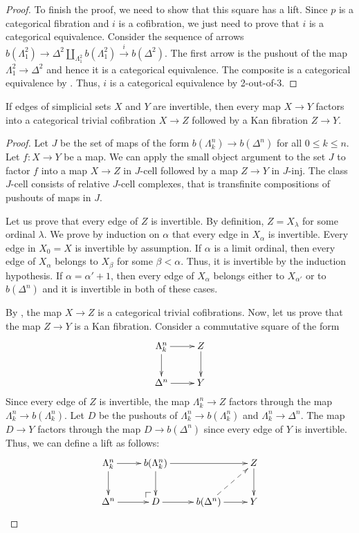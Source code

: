\documentclass[reqno]{amsart}
\makeatletter
\theoremstyle{definition}
\theoremstyle{remark}
\newcommand{\class}[2]{#1\text{-}\mathrm{#2}}
\newcommand{\I}{\mathrm{I}}
\newcommand{\Icell}[1][\I]{\class{#1}{cell}}
\newcommand{\Iinj}[1][\I]{\class{#1}{inj}}
\numberwithin{figure}{section}
\newcommand{\po}[1][dr]{\save*!/#1+1.2pc/#1:(1,-1)@^{|-}\restore}
\makeatother
\begin{document}
\begin{proof}
To finish the proof, we need to show that this square has a lift.
Since $p$ is a categorical fibration and $i$ is a cofibration, we just need to prove that $i$ is a categorical equivalence.
Consider the sequence of arrows $b(\Lambda^2_1) \to \Delta^2 \amalg_{\Lambda^2_1} b(\Lambda^2_1) \xrightarrow{i} b(\Delta^2)$.
The first arrow is the pushout of the map $\Lambda^2_1 \to \Delta^2$ and hence it is a categorical equivalence.
The composite is a categorical equivalence by .
Thus, $i$ is a categorical equivalence by 2-out-of-3.
\end{proof}

\begin{prop}[G-Kan]
If edges of simplicial sets $X$ and $Y$ are invertible, then every map $X \to Y$ factors into a categorical trivial cofibration $X \to Z$ followed by a Kan fibration $Z \to Y$.
\end{prop}
\begin{proof}
Let $J$ be the set of maps of the form $b(\Lambda^n_k) \to b(\Delta^n)$ for all $0 \leq k \leq n$.
Let $f : X \to Y$ be a map.
We can apply the small object argument to the set $J$ to factor $f$ into a map $X \to Z$ in $\Icell[J]$ followed by a map $Z \to Y$ in $\Iinj[J]$.
The class $\Icell[J]$ consists of relative $J$-cell complexes, that is transfinite compositions of pushouts of maps in $J$.

Let us prove that every edge of $Z$ is invertible.
By definition, $Z = X_\lambda$ for some ordinal $\lambda$.
We prove by induction on $\alpha$ that every edge in $X_\alpha$ is invertible.
Every edge in $X_0 = X$ is invertible by assumption.
If $\alpha$ is a limit ordinal, then every edge of $X_\alpha$ belongs to $X_\beta$ for some $\beta < \alpha$.
Thus, it is invertible by the induction hypothesis.
If $\alpha = \alpha' + 1$, then every edge of $X_\alpha$ belongs either to $X_{\alpha'}$ or to $b(\Delta^n)$ and it is invertible in both of these cases.

By , the map $X \to Z$ is a categorical trivial cofibrations.
Now, let us prove that the map $Z \to Y$ is a Kan fibration.
Consider a commutative square of the form
\[ \xymatrix{ \Lambda^n_k \ar[r] \ar[d] & Z \ar[d] \\
              \Delta^n \ar[r]           & Y
            } \]
Since every edge of $Z$ is invertible, the map $\Lambda^n_k \to Z$ factors through the map $\Lambda^n_k \to b(\Lambda^n_k)$.
Let $D$ be the pushouts of $\Lambda^n_k \to b(\Lambda^n_k)$ and $\Lambda^n_k \to \Delta^n$.
The map $D \to Y$ factors through the map $D \to b(\Delta^n)$ since every edge of $Y$ is invertible.
Thus, we can define a lift as follows:
\[ \xymatrix{ \Lambda^n_k \ar[r] \ar[d] & b(\Lambda^n_k) \ar[rr] \ar[d] &                                   & Z \ar[d] \\
              \Delta^n \ar[r]           & \po D \ar[r]                  & b(\Delta^n) \ar@{-->}[ur] \ar[r]  & Y
            } \]
\end{proof}
\end{document}
